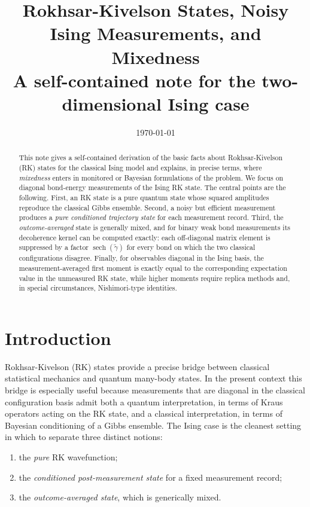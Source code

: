 \documentclass[11pt]{article}
\title{\textbf{Rokhsar-Kivelson States, Noisy Ising Measurements, and Mixedness}\\
\large A self-contained note for the two-dimensional Ising case}
\author{}
\date{\today}
\newcommand{\sech}{\operatorname{sech}}
\begin{document}
\maketitle

\begin{abstract}
This note gives a self-contained derivation of the basic facts about Rokhsar-Kivelson (RK) states for the classical Ising model and explains, in precise terms, where \emph{mixedness} enters in monitored or Bayesian formulations of the problem. We focus on diagonal bond-energy measurements of the Ising RK state. The central points are the following. First, an RK state is a pure quantum state whose squared amplitudes reproduce the classical Gibbs ensemble. Second, a noisy but efficient measurement produces a \emph{pure conditioned trajectory state} for each measurement record. Third, the \emph{outcome-averaged} state is generally mixed, and for binary weak bond measurements its decoherence kernel can be computed exactly: each off-diagonal matrix element is suppressed by a factor $\sech(\tilde\gamma)$ for every bond on which the two classical configurations disagree. Finally, for observables diagonal in the Ising basis, the measurement-averaged first moment is exactly equal to the corresponding expectation value in the unmeasured RK state, while higher moments require replica methods and, in special circumstances, Nishimori-type identities.
\end{abstract}

\section{Introduction}

Rokhsar-Kivelson (RK) states provide a precise bridge between classical statistical mechanics and quantum many-body states. In the present context this bridge is especially useful because measurements that are diagonal in the classical configuration basis admit both a quantum interpretation, in terms of Kraus operators acting on the RK state, and a classical interpretation, in terms of Bayesian conditioning of a Gibbs ensemble. The Ising case is the cleanest setting in which to separate three distinct notions:
\begin{enumerate}[label=\arabic*.]
  \item the \emph{pure} RK wavefunction;
  \item the \emph{conditioned post-measurement state} for a fixed measurement record;
  \item the \emph{outcome-averaged state}, which is generically mixed.
\end{enumerate}
\end{document}
